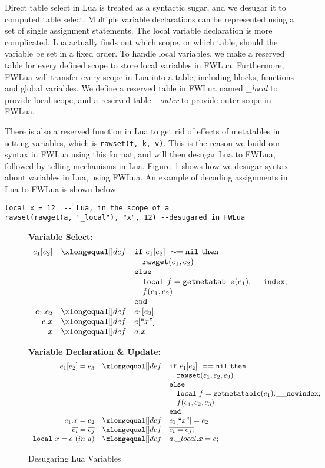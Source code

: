 Direct table select in Lua is treated as a syntactic sugar, and we desugar it to computed table select. 
Multiple variable declarations can be represented using a set of single assignment statements. 
The local variable declaration is more complicated. Lua actually finds out which scope, or which table, should the variable be set in a fixed order.
To handle local variables,
we make a reserved table for every defined scope to store local variables in FWLua. Furthermore, FWLua will transfer every scope in Lua into a table, including blocks, functions and global variables. We define a reserved table in FWLua named {\it \_local} to provide local scope, and a reserved table {\it \_outer} to provide outer scope in FWLua.

There is also a reserved function in Lua to get rid of effects of metatables in setting variables, which is {\tt rawset(t, k, v)}. This is the reason we build our syntax in FWLua using this format, and will then desugar Lua to FWLua, followed by telling mechanisms in Lua.
Figure~\ref{fig:desLuaVar} shows how we desugar syntax about variables in Lua, using FWLua.
An example of decoding assignments in Lua to FWLua is shown below.
\begin{verbatim}
local x = 12  -- Lua, in the scope of a
rawset(rawget(a, "_local"), "x", 12) --desugared in FWLua
\end{verbatim}

\begin{figure}
\caption{Desugaring Lua Variables}\label{fig:desLuaVar}
{\bf Variable Select:}\[
\begin{array}{rclcl}
\desugar{e_1[e_2]}{{\tt if}~ e_1[e_2] ~\sim= {\tt nil} ~ {\tt then}\\}
\desugarline{ 
     \quad{\tt rawget}(e_1, e_2) ~\\
     {\tt else}\\
     \quad{\tt local}~f = {\tt getmetatable}(e_1).{\tt{\_}{\_}index};\\
     \quad f(e_1,e_2)\\ 
     {\tt end}
     }
\desugar{e_1.e_2}{e_1[e_2]}
\desugar{e.x}{e[``x"]}
\desugar{x}{a.x} %
\end{array}\]

{\bf Variable Declaration \& Update:}\[
\begin{array}{rclcl}
\desugar{e_1[e_2]=e_3}{
    {\tt if}~ e_1[e_2] ~== {\tt nil} ~ {\tt then}\\
}
\desugarline{  
     \quad{\tt rawset}(e_1, e_2,e_3) ~\\
     {\tt else}\\
     \quad{\tt local}~f = {\tt getmetatable}(e_1).{\tt{\_}{\_}newindex};\\
     \quad f(e_1,e_2,e_3)\\ 
     {\tt end}\\
}
\desugar{e_1.x=e_2}{e_1[``x"] = e_2}
\desugar{\overline{e_i}=\overline{e_j}}{\overline{e_i = e_j;}} %
\desugar{{\tt local}~x=e~(in~a)}{a.\_local.x = e;} %

\end{array}\]
\end{figure}

